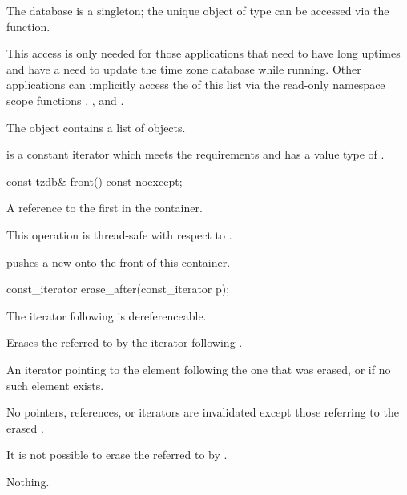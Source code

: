 \pnum
The  database is a singleton;
the unique object of type  can be
accessed via the  function.
\begin{note}
This access is only needed for those applications
that need to have long uptimes and
have a need to update the time zone database while running.
Other applications can implicitly access the  of this list
via the read-only namespace scope functions
,
, and
.
\end{note}
The  object contains a list of  objects.

\pnum
{} is a constant iterator
which meets the  requirements
and has a value type of .

%
\begin{itemdecl}
const tzdb& front() const noexcept;
\end{itemdecl}

\begin{itemdescr}
\pnum
\returns
A reference to the first  in the container.

\pnum
\remarks
This operation is thread-safe with respect to .
\begin{note}
 pushes a new 
onto the front of this container.
\end{note}
\end{itemdescr}

%
\begin{itemdecl}
const_iterator erase_after(const_iterator p);
\end{itemdecl}

\begin{itemdescr}
\pnum
\requires
The iterator following  is dereferenceable.

\pnum
\effects
Erases the  referred to by the iterator following .

\pnum
\returns
An iterator pointing to the element following the one that was erased,
or  if no such element exists.

\pnum
\remarks
No pointers, references, or iterators are invalidated
except those referring to the erased .
\begin{note}
It is not possible to erase the 
referred to by .
\end{note}

\pnum
\throws
Nothing.
\end{itemdescr}


